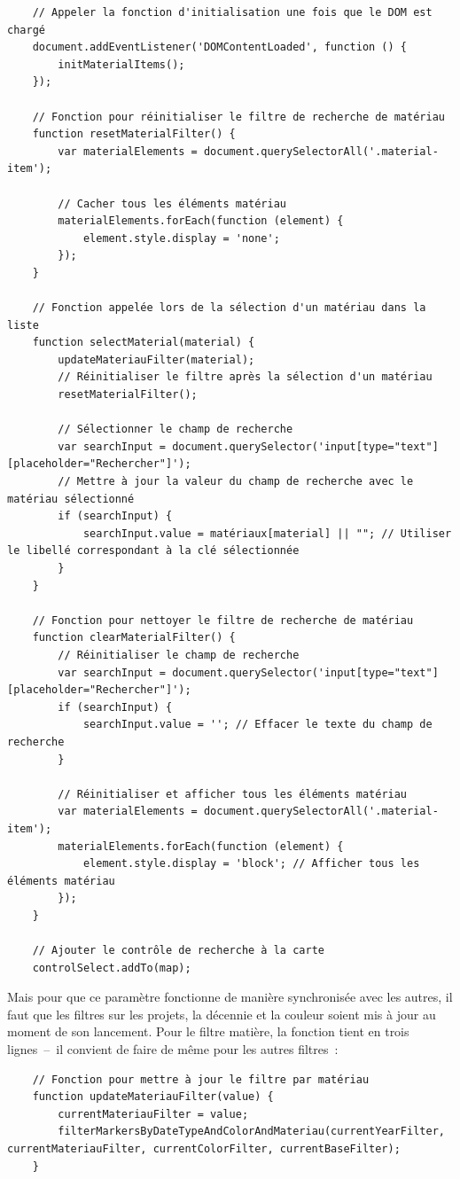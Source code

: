 \begin{lstlisting}
	// Appeler la fonction d'initialisation une fois que le DOM est chargé
	document.addEventListener('DOMContentLoaded', function () {
		initMaterialItems();
	});
	
	// Fonction pour réinitialiser le filtre de recherche de matériau
	function resetMaterialFilter() {
		var materialElements = document.querySelectorAll('.material-item');
		
		// Cacher tous les éléments matériau
		materialElements.forEach(function (element) {
			element.style.display = 'none';
		});
	}
	
	// Fonction appelée lors de la sélection d'un matériau dans la liste
	function selectMaterial(material) {
		updateMateriauFilter(material);
		// Réinitialiser le filtre après la sélection d'un matériau
		resetMaterialFilter();
		
		// Sélectionner le champ de recherche
		var searchInput = document.querySelector('input[type="text"][placeholder="Rechercher"]');
		// Mettre à jour la valeur du champ de recherche avec le matériau sélectionné
		if (searchInput) {
			searchInput.value = matériaux[material] || ""; // Utiliser le libellé correspondant à la clé sélectionnée
		}
	}
	
	// Fonction pour nettoyer le filtre de recherche de matériau
	function clearMaterialFilter() {
		// Réinitialiser le champ de recherche
		var searchInput = document.querySelector('input[type="text"][placeholder="Rechercher"]');
		if (searchInput) {
			searchInput.value = ''; // Effacer le texte du champ de recherche
		}
		
		// Réinitialiser et afficher tous les éléments matériau
		var materialElements = document.querySelectorAll('.material-item');
		materialElements.forEach(function (element) {
			element.style.display = 'block'; // Afficher tous les éléments matériau
		});
	}
	
	// Ajouter le contrôle de recherche à la carte
	controlSelect.addTo(map);
\end{lstlisting}\par
Mais pour que ce paramètre fonctionne de manière synchronisée avec les autres, il faut que les filtres sur les projets, la décennie et la couleur soient mis à jour au moment de son lancement. Pour le filtre matière, la fonction tient en trois lignes~–~il convient de faire de même pour les autres filtres~: 
\begin{lstlisting}
	// Fonction pour mettre à jour le filtre par matériau
	function updateMateriauFilter(value) {
		currentMateriauFilter = value;
		filterMarkersByDateTypeAndColorAndMateriau(currentYearFilter, currentMateriauFilter, currentColorFilter, currentBaseFilter);
	}
\end{lstlisting}\par
